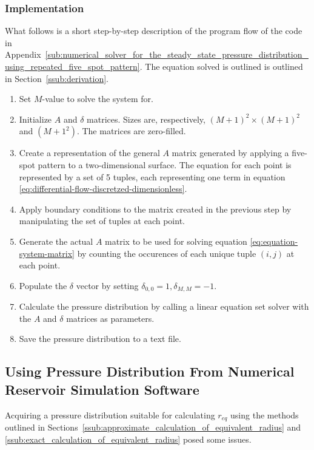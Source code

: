 \subsubsection{Implementation} %
\label{ssub:implementation}
What follows is a short step-by-step description of the program flow of the code in Appendix~\ref{sub:numerical_solver_for_the_steady_state_pressure_distribution_using_repeated_five_spot_pattern}. The equation solved is outlined is outlined in Section~\ref{ssub:derivation}.
\begin{enumerate}
    \item Set $M$-value to solve the system for.
    \item Initialize $A$ and $\delta$ matrices. Sizes are, respectively, $(M+1)^2 \times (M+1)^2$ and $(M+1^2)$. The matrices are zero-filled.
    \item Create a representation of the general $A$ matrix generated by applying a five-spot pattern to a two-dimensional surface. The equation for each point is represented by a set of 5 tuples, each representing one term in equation \eqref{eq:differential-flow-discretzed-dimensionless}.
    \item Apply boundary conditions to the matrix created in the previous step by manipulating the set of tuples at each point.
    \item Generate the actual $A$ matrix to be used for solving equation \eqref{eq:equation-system-matrix} by counting the occurences of each unique tuple $(i,j)$ at each point.
    \item Populate the $\delta$ vector by setting $\delta_{0,0}=1,\delta_{M,M}=-1$.
    \item Calculate the pressure distribution by calling a linear equation set solver with the $A$ and $\delta$ matrices as parameters.
    \item Save the pressure distribution to a text file.
\end{enumerate}


\subsection{Using Pressure Distribution From Numerical Reservoir Simulation Software} %
\label{sub:using_pressure_distribution_from_numerical_reservoir_simulation_software}
Acquiring a pressure distribution suitable for calculating $r_{eq}$ using the methods outlined in Sections~\ref{ssub:approximate_calculation_of_equivalent_radius} and \ref{ssub:exact_calculation_of_equivalent_radius} posed some issues.

